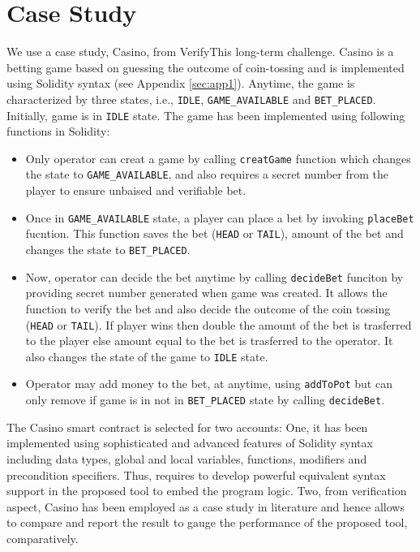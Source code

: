 \documentclass[a4paper,UKenglish,cleveref, autoref, thm-restate]{oasics-v2021}
\begin{document}
\section{Case Study}
We use  a case study, Casino, from VerifyThis long-term challenge. 
%
Casino is a betting game based on guessing the outcome of coin-tossing and is implemented using Solidity syntax (see Appendix \ref{sec:app1}).
%
Anytime, the game is characterized by three states, i.e., \texttt{IDLE}, \texttt{GAME\_AVAILABLE} and \texttt{BET\_PLACED}.
%
Initially, game is in \texttt{IDLE} state.
%
The game has been implemented using following functions in Solidity:
%
\begin{itemize}
\item Only operator can creat a game by calling \texttt{creatGame} function which changes the state to \texttt{GAME\_AVAILABLE},  and also requires a secret number from the player to ensure unbaised and verifiable bet.
%
\item Once in \texttt{GAME\_AVAILABLE} state, a player can place a bet by invoking \texttt{placeBet} fucntion. 
%
This function saves the bet (\texttt{HEAD} or \texttt{TAIL}), amount of the bet and changes the state to \texttt{BET\_PLACED}.
\item Now, operator can decide the bet anytime by calling \texttt{decideBet} funciton by providing secret number generated when game was created.
%
It allows the function to verify the bet and also decide the outcome of the coin tossing (\texttt{HEAD} or \texttt{TAIL}).
%
If player wins then double the amount of the bet is trasferred to the player else amount equal to the bet is trasferred to the operator.
%
It also changes the state of the game to \texttt{IDLE} state.
\item Operator may add money to the bet, at anytime,  using \texttt{addToPot} but can only remove if game is in not in \texttt{BET\_PLACED} state by calling \texttt{decideBet}.
\end{itemize}
%
The Casino smart contract is selected for two accounts: One, it has been implemented using sophisticated and advanced features of Solidity syntax including data types, global and local variables, functions, modifiers and precondition specifiers. 
%
Thus, requires to develop powerful equivalent syntax support in the proposed tool to embed the program logic. Two, from verification aspect, Casino has been employed as a case study in literature and hence allows to compare and report the result to gauge the performance of the proposed tool, comparatively.
\end{document}
